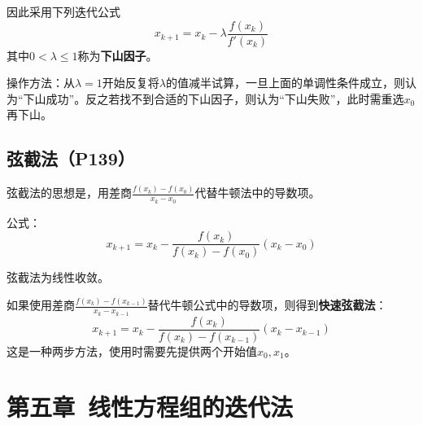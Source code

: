\documentclass[fontset=ubuntu]{ctexart}
\numberwithin{equation}{section}
\numberwithin{theorem}{section}
\begin{document}
\begin{multicols}{2}
    因此采用下列迭代公式
    \begin{equation}
        x_{k+1}=x_k-\lambda\frac{f(x_k)}{f'(x_k)}
    \end{equation}
    其中$0<\lambda\leq1$称为\textbf{下山因子}。

    操作方法：从$\lambda=1$开始反复将$\lambda$的值减半试算，一旦上面的单调性条件成立，则认为“下山成功”。反之若找不到合适的下山因子，则认为“下山失败”，此时需重选$x_0$再下山。

    \subsection{弦截法（P139）}

    弦截法的思想是，用差商$\frac{f(x_k)-f(x_0)}{x_k-x_0}$代替牛顿法中的导数项。

    公式：
    \begin{equation}
        x_{k+1}=x_k-\frac{f(x_k)}{f(x_k)-f(x_0)}(x_k-x_0)
    \end{equation}
    
    弦截法为线性收敛。

    如果使用差商$\frac{f(x_k)-f(x_{k-1})}{x_k-x_{k-1}}$替代牛顿公式中的导数项，则得到\textbf{快速弦截法}：
    \begin{equation}
        x_{k+1}=x_k-\frac{f(x_k)}{f(x_k)-f(x_{k-1})}(x_k-x_{k-1})
    \end{equation}
    这是一种两步方法，使用时需要先提供两个开始值$x_0,x_1$。

\end{multicols}


\section{第五章\ 线性方程组的迭代法}
\end{document}
